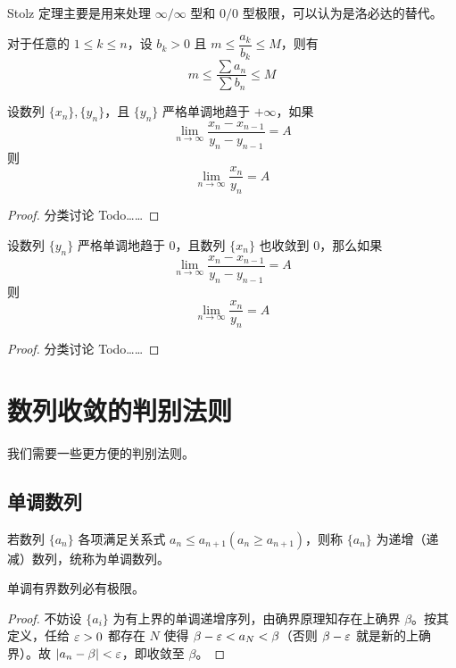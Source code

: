 Stolz 定理主要是用来处理 $\infty/\infty$ 型和 $0/0$ 型极限，可以认为是洛必达的替代。

\begin{theorem}
	对于任意的 $1 \leqslant k \leqslant n$，设 $b_k>0$ 且 $m \leqslant \dfrac{a_k}{b_k} \leqslant M$，则有
	\[m \leqslant \frac{\sum a_n}{\sum b_n} \leqslant M\]
\end{theorem}

\begin{theorem}
	设数列 $\{x_n\},\{y_n\}$，且 $\{y_n\}$ 严格单调地趋于 $+\infty$，如果
	\[\lim_{n\to \infty}\frac{x_n-x_{n-1}}{y_n-y_{n-1}}=A\]
	则
	\[\lim_{n\to \infty} \frac{x_n}{y_n} = A\]
\end{theorem}

\begin{proof}
	分类讨论 Todo……
\end{proof}

\begin{theorem}
	设数列 $\{y_n\}$ 严格单调地趋于 $0$，且数列 $\{x_n\}$ 也收敛到 $0$，那么如果
	\[\lim_{n\to \infty}\frac{x_n-x_{n-1}}{y_n-y_{n-1}}=A\]
	则
	\[\lim_{n\to \infty} \frac{x_n}{y_n} = A\]
\end{theorem}

\begin{proof}
	分类讨论 Todo……
\end{proof}


\section{数列收敛的判别法则}

我们需要一些更方便的判别法则。

\subsection{单调数列}

若数列 $\{a_n\}$ 各项满足关系式 $a_n \leqslant a_{n+1}(a_n \geqslant a_{n+1})$，则称 $\{a_n\}$ 为递增（递减）数列，统称为单调数列。

\begin{theorem}[单调有界定理]
	单调有界数列必有极限。
\end{theorem}

\begin{proof}
	不妨设 $\{a_i\}$ 为有上界的单调递增序列，由确界原理知存在上确界 $\beta$。按其定义，任给 $\varepsilon > 0$ 都存在 $N$ 使得 $\beta - \varepsilon < a_N < \beta$（否则 $\beta - \varepsilon$ 就是新的上确界）。故 $|a_n - \beta| < \varepsilon$，即收敛至 $\beta$。
\end{proof}


